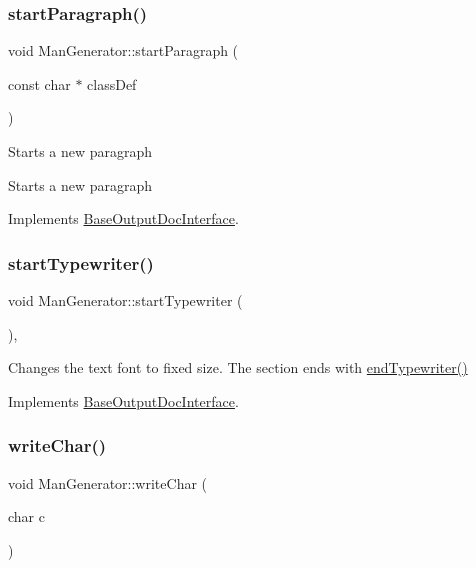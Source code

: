 \subsubsection{\texorpdfstring{startParagraph()}{startParagraph()}}
{\footnotesize\ttfamily void Man\+Generator\+::start\+Paragraph (\begin{DoxyParamCaption}\item[{const char $\ast$}]{class\+Def }\end{DoxyParamCaption})\hspace{0.3cm}{\ttfamily [virtual]}}

Starts a new paragraph

Starts a new paragraph 

Implements \mbox{\hyperlink{class_base_output_doc_interface_a9f711f4ef8f48b9c7b1cae625578e7ff}{Base\+Output\+Doc\+Interface}}.

\mbox{\label{class_man_generator_aa03f575a82549d2393bb080337769f1c}} 
\subsubsection{\texorpdfstring{startTypewriter()}{startTypewriter()}}
{\footnotesize\ttfamily void Man\+Generator\+::start\+Typewriter (\begin{DoxyParamCaption}{ }\end{DoxyParamCaption})\hspace{0.3cm}{\ttfamily [inline]}, {\ttfamily [virtual]}}

Changes the text font to fixed size. The section ends with \mbox{\hyperlink{class_man_generator_a918922201985cac387c671a9767021d1}{end\+Typewriter()}} 

Implements \mbox{\hyperlink{class_base_output_doc_interface_abde41a60b900d35b0b198f43731c1cd0}{Base\+Output\+Doc\+Interface}}.

\mbox{\label{class_man_generator_a5831577a90e226daf7ad892dd8744d33}} 
\subsubsection{\texorpdfstring{writeChar()}{writeChar()}}
{\footnotesize\ttfamily void Man\+Generator\+::write\+Char (\begin{DoxyParamCaption}\item[{char}]{c }\end{DoxyParamCaption})\hspace{0.3cm}{\ttfamily [virtual]}}

